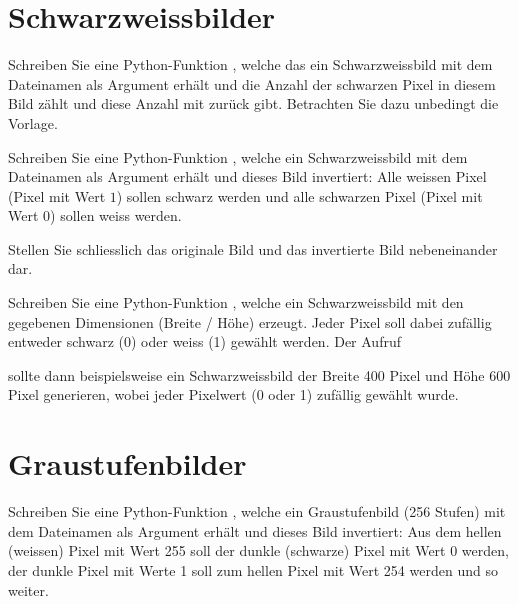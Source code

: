 \begin{questions}
	\section*{Schwarzweissbilder}

	Schreiben Sie eine Python-Funktion , welche das ein Schwarzweissbild mit dem Dateinamen  als Argument erhält und die Anzahl der schwarzen Pixel in diesem Bild zählt und diese Anzahl mit  zurück gibt. Betrachten Sie dazu unbedingt die Vorlage.


	Schreiben Sie eine Python-Funktion , welche ein Schwarzweissbild mit dem Dateinamen  als Argument erhält und dieses Bild invertiert: Alle weissen Pixel (Pixel mit Wert $1$) sollen schwarz werden und alle schwarzen Pixel (Pixel mit Wert $0$) sollen weiss werden.

	Stellen Sie schliesslich das originale Bild und das invertierte Bild nebeneinander dar.


	Schreiben Sie eine Python-Funktion , welche ein Schwarzweissbild mit den gegebenen Dimensionen (Breite / Höhe) erzeugt.
	Jeder Pixel soll dabei zufällig entweder schwarz (0) oder weiss (1) gewählt werden. Der Aufruf
	\begin{center}
	\end{center}
	sollte dann beispielsweise ein Schwarzweissbild der Breite 400 Pixel und Höhe 600 Pixel generieren, wobei jeder Pixelwert (0 oder 1) zufällig gewählt wurde.

	\section*{Graustufenbilder}


	Schreiben Sie eine Python-Funktion , welche ein Graustufenbild (256 Stufen) mit dem Dateinamen  als Argument erhält und dieses Bild invertiert: Aus dem hellen (weissen) Pixel mit Wert 255 soll der dunkle (schwarze) Pixel mit Wert 0 werden, der dunkle Pixel mit Werte 1 soll zum hellen Pixel mit Wert 254 werden und so weiter.


\end{questions}
